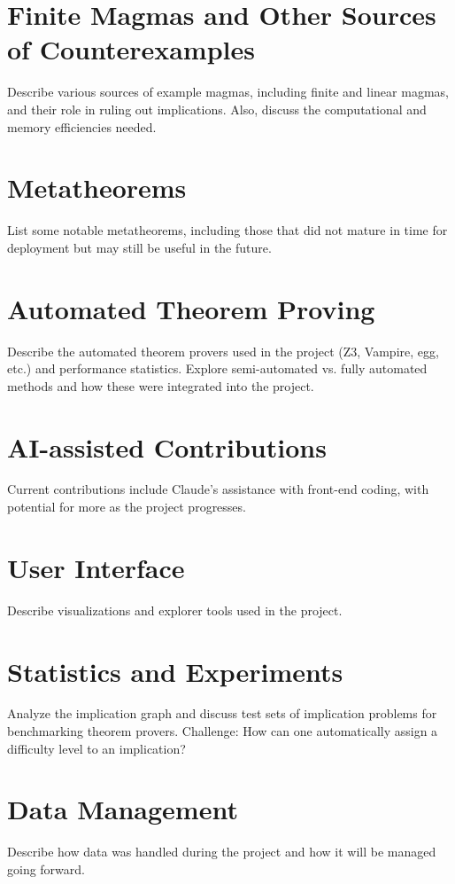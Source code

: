 \documentclass[12pt]{article}
\theoremstyle{definition}
\begin{document}
\section{Finite Magmas and Other Sources of Counterexamples}
Describe various sources of example magmas, including finite and linear magmas, and their role in ruling out implications. Also, discuss the computational and memory efficiencies needed.

\section{Metatheorems}
List some notable metatheorems, including those that did not mature in time for deployment but may still be useful in the future.

\section{Automated Theorem Proving}
Describe the automated theorem provers used in the project (Z3, Vampire, egg, etc.) and performance statistics. Explore semi-automated vs. fully automated methods and how these were integrated into the project.

\section{AI-assisted Contributions}
Current contributions include Claude’s assistance with front-end coding, with potential for more as the project progresses.

\section{User Interface}
Describe visualizations and explorer tools used in the project.

\section{Statistics and Experiments}
Analyze the implication graph and discuss test sets of implication problems for benchmarking theorem provers. Challenge: How can one automatically assign a difficulty level to an implication?

\section{Data Management}
Describe how data was handled during the project and how it will be managed going forward.
\end{document}
